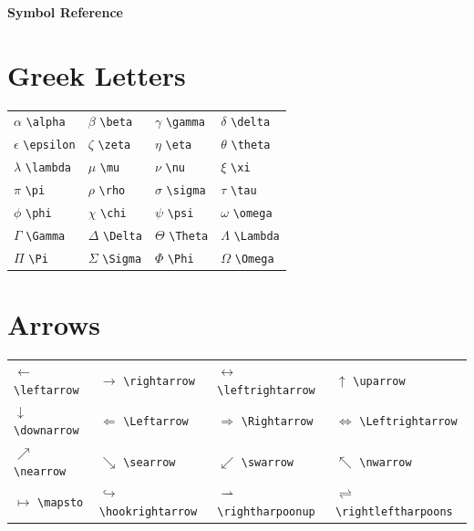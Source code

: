 \documentclass[11pt]{article}
\begin{document}
\centerline{\Large\bf Symbol Reference}\par
\bigskip

\section{Greek Letters}

\begin{tabular}{llll}
$\alpha$ \texttt{\textbackslash alpha} &
$\beta$ \texttt{\textbackslash beta} &
$\gamma$ \texttt{\textbackslash gamma} &
$\delta$ \texttt{\textbackslash delta} \\
$\epsilon$ \texttt{\textbackslash epsilon} &
$\zeta$ \texttt{\textbackslash zeta} &
$\eta$ \texttt{\textbackslash eta} &
$\theta$ \texttt{\textbackslash theta} \\
$\lambda$ \texttt{\textbackslash lambda} &
$\mu$ \texttt{\textbackslash mu} &
$\nu$ \texttt{\textbackslash nu} &
$\xi$ \texttt{\textbackslash xi} \\
$\pi$ \texttt{\textbackslash pi} &
$\rho$ \texttt{\textbackslash rho} &
$\sigma$ \texttt{\textbackslash sigma} &
$\tau$ \texttt{\textbackslash tau} \\
$\phi$ \texttt{\textbackslash phi} &
$\chi$ \texttt{\textbackslash chi} &
$\psi$ \texttt{\textbackslash psi} &
$\omega$ \texttt{\textbackslash omega} \\[4pt]
$\Gamma$ \texttt{\textbackslash Gamma} &
$\Delta$ \texttt{\textbackslash Delta} &
$\Theta$ \texttt{\textbackslash Theta} &
$\Lambda$ \texttt{\textbackslash Lambda} \\
$\Pi$ \texttt{\textbackslash Pi} &
$\Sigma$ \texttt{\textbackslash Sigma} &
$\Phi$ \texttt{\textbackslash Phi} &
$\Omega$ \texttt{\textbackslash Omega} \\
\end{tabular}

\section{Arrows}

\begin{tabular}{llll}
$\leftarrow$ \texttt{\textbackslash leftarrow} &
$\rightarrow$ \texttt{\textbackslash rightarrow} &
$\leftrightarrow$ \texttt{\textbackslash leftrightarrow} &
$\uparrow$ \texttt{\textbackslash uparrow} \\
$\downarrow$ \texttt{\textbackslash downarrow} &
$\Leftarrow$ \texttt{\textbackslash Leftarrow} &
$\Rightarrow$ \texttt{\textbackslash Rightarrow} &
$\Leftrightarrow$ \texttt{\textbackslash Leftrightarrow} \\
$\nearrow$ \texttt{\textbackslash nearrow} &
$\searrow$ \texttt{\textbackslash searrow} &
$\swarrow$ \texttt{\textbackslash swarrow} &
$\nwarrow$ \texttt{\textbackslash nwarrow} \\
$\mapsto$ \texttt{\textbackslash mapsto} &
$\hookrightarrow$ \texttt{\textbackslash hookrightarrow} &
$\rightharpoonup$ \texttt{\textbackslash rightharpoonup} &
$\rightleftharpoons$ \texttt{\textbackslash rightleftharpoons} \\
\end{tabular}
\end{document}
